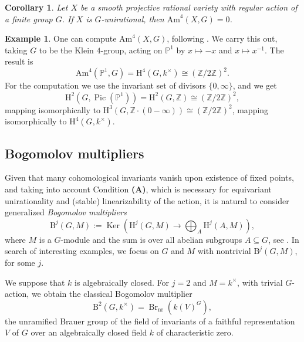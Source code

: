 \documentclass[12pt,reqno]{amsart}
\theoremstyle{plain}
\newtheorem{coro}[prop]{Corollary}
\theoremstyle{remark}
\theoremstyle{definition}
\newtheorem{exam}[prop]{Example}
\numberwithin{equation}{section}
\newcommand{\bP}{{\mathbb P}}
\newcommand{\Q}{{\mathbb Q}}
\newcommand{\Z}{{\mathbb Z}}
\newcommand{\rB}{{\mathrm B}}
\newcommand{\rH}{{\mathrm H}}
\newcommand{\bZ}{{\mathbb Z}}
\newcommand{\Am}{\mathrm{Am}}
\DeclareMathOperator{\Pic}{Pic}
\DeclareMathOperator{\Br}{Br}
\DeclareMathOperator{\Ker}{Ker}
\begin{document}
\begin{coro}
\label{cor:amit4}
Let $X$ be a smooth projective rational variety with regular action of a finite group $G$.
If $X$ is $G$-unirational, then $\mathrm{Am}^4(X,G)=0$.
\end{coro}







\begin{exam}
\label{exa.K4P1}
One can compute $\Am^4(X,G)$, following \cite[p. 
~84]{KT-quotient}.
We carry this out, taking $G$ to be
the Klein $4$-group, acting on $\bP^1$ by $x\mapsto -x$ and $x\mapsto x^{-1}$.
The result is
\[ \Am^4(\bP^1,G)=\rH^4(G,k^\times)\cong (\bZ/2\bZ)^2. \]
For the computation we use the invariant set of divisors $\{0,\infty\}$, and we get
$$
\rH^2(G,\Pic(\bP^1))=\rH^2(G,\bZ)\cong (\bZ/2\bZ)^2,
$$
mapping isomorphically to
$\rH^3(G,\Z\cdot(0-\infty))\cong (\bZ/2\bZ)^2$, mapping isomorphically to $\rH^4(G,k^\times)$.
\end{exam}




\subsection*{Bogomolov multipliers}
Given that many cohomological invariants vanish upon existence of fixed points, and taking into account Condition {\bf (A)}, which is necessary for equivariant unirationality and (stable) linearizability of the action, it is natural to consider generalized {\em Bogomolov multipliers}
$$
\rB^j(G,M):=\Ker\left( \rH^j(G,M)\to \bigoplus_{A} 
\rH^j(A,M)\right), 
$$
where $M$ is a $G$-module and the sum is over all abelian subgroups $A\subseteq G$, see  \cite[Sect. 2]{TZ-uni}.
In search of interesting examples, we focus on $G$ and $M$ with nontrivial $\rB^j(G,M)$, for some $j$.  

We suppose that $k$ is algebraically closed.
For $j=2$ and $M=k^\times$, with trivial $G$-action, we obtain the classical Bogomolov multiplier
$$
\rB^2(G,k^\times)= \Br_{\mathrm{nr}}(k(V)^G),
$$
the unramified Brauer group of the field of invariants of a faithful representation $V$ of $G$ \cite{B-Brauer} over an algebraically closed field $k$ of characteristic zero.
\end{document}
